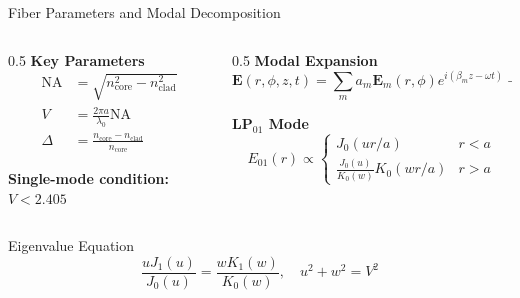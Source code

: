 \documentclass[10pt]{beamer}
\begin{document}
\begin{frame}{Fiber Parameters and Modal Decomposition}
\begin{columns}
\begin{column}{0.5\textwidth}
\textbf{Key Parameters}
\begin{align*}
\text{NA} &= \sqrt{n_{\text{core}}^2 - n_{\text{clad}}^2} \\
V &= \frac{2\pi a}{\lambda_0}\text{NA} \\
\Delta &= \frac{n_{\text{core}} - n_{\text{clad}}}{n_{\text{core}}}
\end{align*}

\textbf{Single-mode condition:} $V < 2.405$
\end{column}

\begin{column}{0.5\textwidth}
\textbf{Modal Expansion}
\begin{equation*}
\mathbf{E}(r,\phi,z,t) = \sum_m a_m \mathbf{E}_m(r,\phi) e^{i(\beta_m z - \omega t)} + \text{c.c.}
\end{equation*}

\textbf{LP$_{01}$ Mode}
\begin{equation*}
E_{01}(r) \propto \begin{cases}
J_0(ur/a) & r < a \\
\frac{J_0(u)}{K_0(w)}K_0(wr/a) & r > a
\end{cases}
\end{equation*}
\end{column}
\end{columns}

\begin{block}{Eigenvalue Equation}
\begin{equation*}
\frac{u J_1(u)}{J_0(u)} = \frac{w K_1(w)}{K_0(w)}, \quad u^2 + w^2 = V^2
\end{equation*}
\end{block}
\end{frame}
\end{document}
